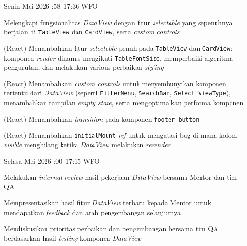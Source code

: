 \begin{logtable}
    {
        Senin  Mei 2026 :58--17:36 \linebreak %
        WFO
    }{
        \begin{loglist}
            \item Melengkapi fungsionalitas \textit{DataView} dengan fitur \textit{selectable}
            yang sepenuhnya berjalan di \texttt{TableView} dan \texttt{CardView}, serta
            \textit{custom controls}
        \end{loglist}
    }{
        \begin{logwork}
            \item (React) Menambahkan fitur \textit{selectable} penuh pada \texttt{TableView} dan \texttt{CardView}: komponen \textit{render} dinamis mengikuti \texttt{TableFontSize}, memperbaiki algoritma pengurutan, dan melakukan various perbaikan \textit{styling}
            \item (React) Menambahkan \textit{custom controls} untuk menyembunyikan komponen tertentu dari \textit{DataView} (seperti \texttt{FilterMenu}, \texttt{SearchBar}, \texttt{Select ViewType}), menambahkan tampilan \textit{empty state}, serta mengoptimalkan performa komponen
            \item (React) Menambahkan \textit{transition} pada komponen \texttt{footer-button}
            \item (React) Menambahkan \texttt{initialMount} \textit{ref} untuk mengatasi bug di mana kolom \textit{visible} menghilang ketika \textit{DataView} melakukan \textit{rerender}
        \end{logwork}
    }

    {
        Selasa  Mei 2026 :00--17:15 \linebreak %
        WFO
    }{
        \begin{loglist}
            \item Melakukan \textit{internal review} hasil pekerjaan \textit{DataView} bersama
            Mentor dan tim QA
        \end{loglist}
    }{
        \begin{logwork}
            \item Mempresentasikan hasil fitur \textit{DataView} terbaru kepada Mentor untuk
            mendapatkan \textit{feedback} dan arah pengembangan selanjutnya
            \item Mendiskusikan prioritas perbaikan dan pengembangan bersama tim QA berdasarkan
            hasil \textit{testing} komponen \textit{DataView}
        \end{logwork}
    }


\end{logtable}
